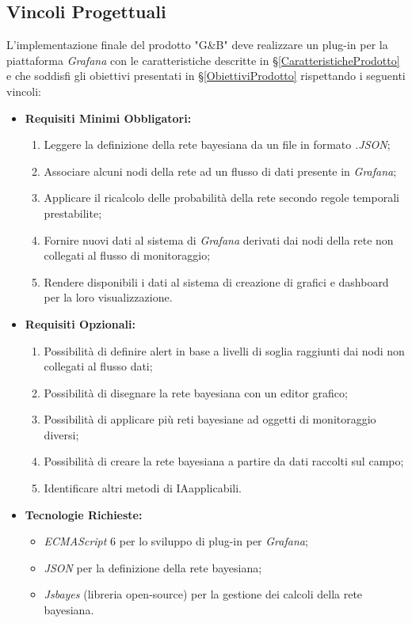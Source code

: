 \subsection{Vincoli Progettuali}\label{VincoliProgettuali}
L'implementazione finale del prodotto "G\&B" deve realizzare un plug-in per la piattaforma \textit{Grafana} con le caratteristiche descritte in §\ref{CaratteristicheProdotto} e che soddisfi gli obiettivi presentati in §\ref{ObiettiviProdotto} rispettando i seguenti vincoli:
\begin{itemize}
\item \textbf{Requisiti Minimi Obbligatori:}
	\begin{enumerate}
	\item Leggere la definizione della rete bayesiana da un file in formato \textit{.JSON};
	\item Associare alcuni nodi della rete ad un flusso di dati presente in \textit{Grafana};
	\item Applicare il ricalcolo delle probabilità della rete secondo regole temporali prestabilite;
	\item Fornire nuovi dati al sistema di \textit{Grafana} derivati dai nodi della rete non collegati al flusso di monitoraggio;
	\item Rendere disponibili i dati al sistema di creazione di grafici e dashboard per la loro visualizzazione.
	\end{enumerate}
\item \textbf{Requisiti Opzionali:}
	\begin{enumerate}
	\item Possibilità di definire alert in base a livelli di soglia raggiunti dai nodi non collegati al flusso dati;
	\item Possibilità di disegnare la rete bayesiana con un editor grafico;
	\item Possibilità di applicare più reti bayesiane ad oggetti di monitoraggio diversi;
	\item Possibilità di creare la rete bayesiana a partire da dati raccolti sul campo;
	\item Identificare altri metodi di IA\glossario applicabili.
	\end{enumerate}
\item \textbf{Tecnologie Richieste:}
	\begin{itemize}
	\item \textit{ECMAScript\glossario} 6 per lo sviluppo di plug-in per \textit{Grafana};
	\item \textit{JSON} per la definizione della rete bayesiana;
	\item \textit{Jsbayes} (libreria open-source) per la gestione dei calcoli della rete bayesiana.
	\end{itemize}
\end{itemize}
 

